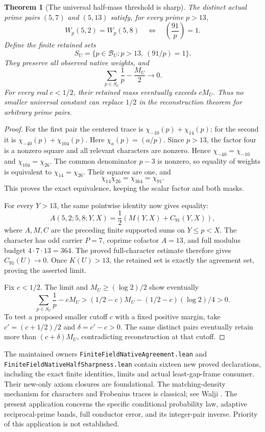 \documentclass[11pt]{article}
\newtheorem{theorem}{Theorem}[section]
\begin{document}
\begin{theorem}[The universal half-mass threshold is sharp]
\label{thm:native-half-sharp}
The distinct actual prime pairs \((5,7)\) and \((5,13)\) satisfy,
for every prime \(p>13\),
\[
 W_p(5,2)=W_p(5,8)
               \quad\Longleftrightarrow\quad \left(\frac{91}p\right)=1.
\]
Define the finite retained sets
\[
 S_U=\{p\in\mathcal B_U:p>13,\ (91/p)=1\}.
\]
They preserve all observed native weights, and
\[
 \sum_{p\in S_U}\frac1p-\frac{M_U}{2}\longrightarrow0.
\]
For every real \(c<1/2\), their retained mass eventually exceeds
\(cM_U\). Thus no smaller universal constant can replace \(1/2\)
in the reconstruction theorem for arbitrary prime pairs.
\end{theorem}
\begin{proof}
For the first pair the centered trace is
\(\chi_{-10}(p)+\chi_{14}(p)\); for the second it is
\(\chi_{-40}(p)+\chi_{104}(p)\).
Here \(\chi_a(p)=(a/p)\).
Since \(p>13\), the factor four is a nonzero square and all
relevant characters are nonzero. Hence
\(\chi_{-40}=\chi_{-10}\) and \(\chi_{104}=\chi_{26}\).
The common denominator \(p-3\) is nonzero, so equality of weights
is equivalent to \(\chi_{14}=\chi_{26}\). Their squares are one,
and
\[
                    \chi_{14}\chi_{26}
                       =\chi_{364}=\chi_{91}.
\]
This proves the exact equivalence, keeping the scalar factor and
both masks.

For every \(Y>13\), the same pointwise identity now gives equality:
\[
 A(5,2;5,8;Y,X)
       =\frac12\left(M(Y,X)+C_{91}(Y,X)\right),
\]
where \(A,M,C\) are the preceding finite supported sums on
\(Y\le p<X\). The character has odd carrier \(P=7\), coprime
cofactor \(A=13\), and full modulus budget \(4\cdot7\cdot13=364\).
The proved full-character estimate therefore gives
\(C_{91}(U)\to0\). Once \(K(U)>13\), the retained set is exactly
the agreement set, proving the asserted limit.

Fix \(c<1/2\). The limit and \(M_U\ge(\log2)/2\) show eventually
\[
 \sum_{p\in S_U}\frac1p-cM_U
 >(1/2-c)M_U-(1/2-c)(\log2)/4>0.
\]
To test a proposed smaller cutoff \(c\) with a fixed positive
margin, take \(c'=(c+1/2)/2\) and \(\delta=c'-c>0\).
The same distinct pairs eventually retain more than
\((c+\delta)M_U\), contradicting reconstruction at that cutoff.
\end{proof}

The maintained owners \texttt{FiniteFieldNativeAgreement.lean} and
\texttt{FiniteFieldNativeHalfSharpness.lean} contain sixteen new
proved declarations, including the exact finite identities, limits
and actual least-gap-frame consumer. Their new-only axiom closures
are foundational. The matching-density mechanism for characters
and Frobenius traces is classical; see Walji
\cite{WaljiMatchingDensities}. The present application concerns the
specific conditional probability law, adaptive reciprocal-prime
bands, full conductor error, and its integer-pair inverse.
Priority of this application is not established.
\end{document}
